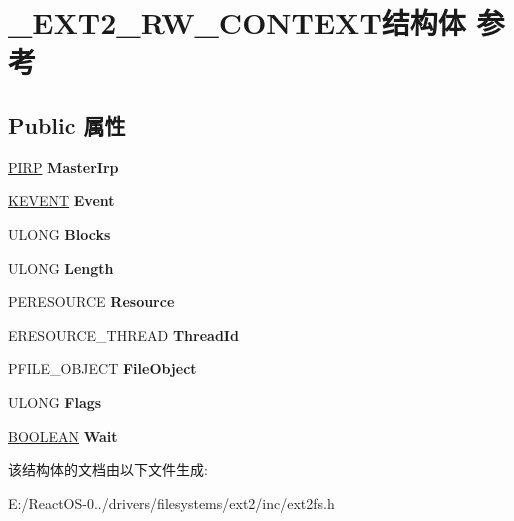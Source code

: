 \hypertarget{struct___e_x_t2___r_w___c_o_n_t_e_x_t}{}\section{\+\_\+\+E\+X\+T2\+\_\+\+R\+W\+\_\+\+C\+O\+N\+T\+E\+X\+T结构体 参考}
\label{struct___e_x_t2___r_w___c_o_n_t_e_x_t}
\subsection*{Public 属性}
\begin{DoxyCompactItemize}
\item 
\mbox{\label{struct___e_x_t2___r_w___c_o_n_t_e_x_t_af040818a6b3eafa31acfe2ab5ef1fa13}} 
\hyperlink{interfacevoid}{P\+I\+RP} {\bfseries Master\+Irp}
\item 
\mbox{\label{struct___e_x_t2___r_w___c_o_n_t_e_x_t_a18ff5e660cae6846cb953c369d34677b}} 
\hyperlink{struct___k_e_v_e_n_t}{K\+E\+V\+E\+NT} {\bfseries Event}
\item 
\mbox{\label{struct___e_x_t2___r_w___c_o_n_t_e_x_t_a0805392a8d873f36c9b8add211bca6d8}} 
U\+L\+O\+NG {\bfseries Blocks}
\item 
\mbox{\label{struct___e_x_t2___r_w___c_o_n_t_e_x_t_a8c1515a069abe7d59803afb1b2d4b8d6}} 
U\+L\+O\+NG {\bfseries Length}
\item 
\mbox{\label{struct___e_x_t2___r_w___c_o_n_t_e_x_t_a004747616dd2af088a5419199f5d5530}} 
P\+E\+R\+E\+S\+O\+U\+R\+CE {\bfseries Resource}
\item 
\mbox{\label{struct___e_x_t2___r_w___c_o_n_t_e_x_t_acc7b000473b3d497d856704cdf05be3a}} 
E\+R\+E\+S\+O\+U\+R\+C\+E\+\_\+\+T\+H\+R\+E\+AD {\bfseries Thread\+Id}
\item 
\mbox{\label{struct___e_x_t2___r_w___c_o_n_t_e_x_t_af96eedfbeea6e20620c2120fb95335ea}} 
P\+F\+I\+L\+E\+\_\+\+O\+B\+J\+E\+CT {\bfseries File\+Object}
\item 
\mbox{\label{struct___e_x_t2___r_w___c_o_n_t_e_x_t_ae1507747e1342ce46aa51b25650e45ad}} 
U\+L\+O\+NG {\bfseries Flags}
\item 
\mbox{\label{struct___e_x_t2___r_w___c_o_n_t_e_x_t_a838d297b501aa9bdd88805c78a5bae38}} 
\hyperlink{_processor_bind_8h_a112e3146cb38b6ee95e64d85842e380a}{B\+O\+O\+L\+E\+AN} {\bfseries Wait}
\end{DoxyCompactItemize}


该结构体的文档由以下文件生成\+:\begin{DoxyCompactItemize}
\item 
E\+:/\+React\+O\+S-\/0../drivers/filesystems/ext2/inc/ext2fs.\+h\end{DoxyCompactItemize}
